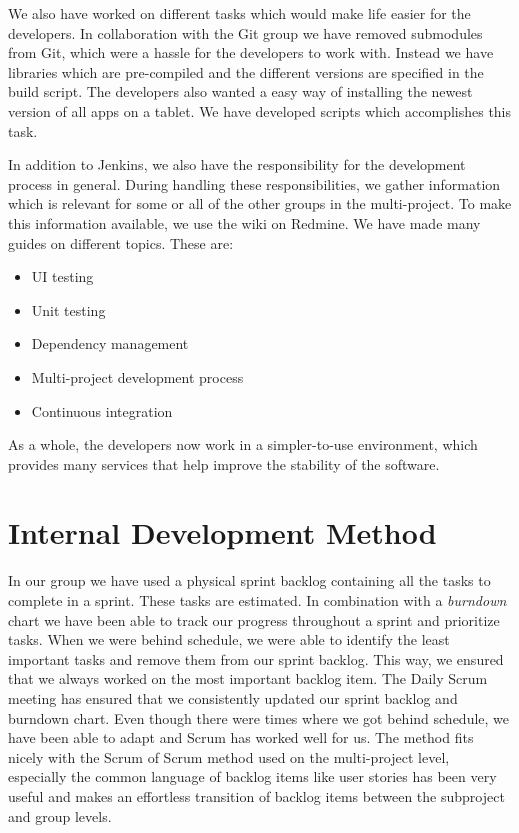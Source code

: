 We also have worked on different tasks which would make life easier for the developers. In collaboration with the Git group we have removed submodules from Git, which were a hassle for the developers to work with. Instead we have libraries which are pre-compiled and the different versions are specified in the build script. The developers also wanted a easy way of installing the newest version of all apps on a tablet. We have developed scripts which accomplishes this task.

In addition to Jenkins, we also have the responsibility for the development process in general. During handling these responsibilities, we gather information which is relevant for some or all of the other groups in the multi-project. To make this information available, we use the wiki on Redmine. We have made many guides on different topics. These are:

\begin{itemize}
  \item UI testing
  \item Unit testing
  \item Dependency management
  \item Multi-project development process
  \item Continuous integration
\end{itemize}

As a whole, the developers now work in a simpler-to-use environment, which provides many services that help improve the stability of the software.

\section{Internal Development Method}\label{conc:internalprocess}
In our group we have used a physical sprint backlog containing all the tasks to complete in a sprint. These tasks are estimated. In combination with a \emph{burndown} chart we have been able to track our progress throughout a sprint and prioritize tasks. When we were behind schedule, we were able to identify the least important tasks and remove them from our sprint backlog. This way, we ensured that we always worked on the most important backlog item. The Daily Scrum meeting has ensured that we consistently updated our sprint backlog and burndown chart. Even though there were times where we got behind schedule, we have been able to adapt and Scrum has worked well for us. The method fits nicely with the Scrum of Scrum method used on the multi-project level, especially the common language of backlog items like user stories has been very useful and makes an effortless transition of backlog items between the subproject and group levels.

